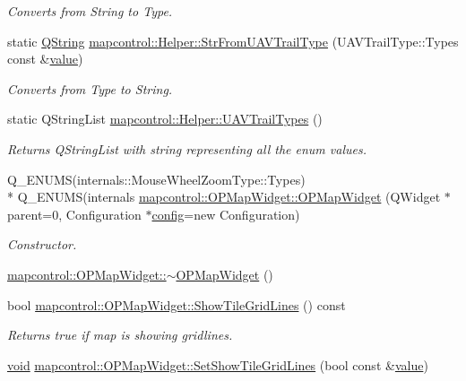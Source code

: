 \begin{DoxyCompactItemize}
\begin{DoxyCompactList}\small\item\em Converts from String to Type. \end{DoxyCompactList}\item 
static \hyperlink{group___u_a_v_objects_plugin_gab9d252f49c333c94a72f97ce3105a32d}{Q\-String} \hyperlink{group___o_p_map_widget_gab2895e09cf7115779c738cc43d815123}{mapcontrol\-::\-Helper\-::\-Str\-From\-U\-A\-V\-Trail\-Type} (U\-A\-V\-Trail\-Type\-::\-Types const \&\hyperlink{glext_8h_aa0e2e9cea7f208d28acda0480144beb0}{value})
\begin{DoxyCompactList}\small\item\em Converts from Type to String. \end{DoxyCompactList}\item 
static Q\-String\-List \hyperlink{group___o_p_map_widget_gad33e776681a2d3d4d44bef508d231336}{mapcontrol\-::\-Helper\-::\-U\-A\-V\-Trail\-Types} ()
\begin{DoxyCompactList}\small\item\em Returns Q\-String\-List with string representing all the enum values. \end{DoxyCompactList}\item 
Q\-\_\-\-E\-N\-U\-M\-S(internals\-::\-Mouse\-Wheel\-Zoom\-Type\-::\-Types) \\*
Q\-\_\-\-E\-N\-U\-M\-S(internals \hyperlink{group___o_p_map_widget_ga390f25c0a1e661e1496be4b21c4b4796}{mapcontrol\-::\-O\-P\-Map\-Widget\-::\-O\-P\-Map\-Widget} (Q\-Widget $\ast$parent=0, Configuration $\ast$\hyperlink{deflate_8c_a4473b5227787415097004fd39f55185e}{config}=new Configuration)
\begin{DoxyCompactList}\small\item\em Constructor. \end{DoxyCompactList}\item 
\hyperlink{group___o_p_map_widget_gabdcfea44244e345b2e4c966cc8d8c3c6}{mapcontrol\-::\-O\-P\-Map\-Widget\-::$\sim$\-O\-P\-Map\-Widget} ()
\item 
bool \hyperlink{group___o_p_map_widget_ga206c68521bc221bc6db0e63e187c4481}{mapcontrol\-::\-O\-P\-Map\-Widget\-::\-Show\-Tile\-Grid\-Lines} () const 
\begin{DoxyCompactList}\small\item\em Returns true if map is showing gridlines. \end{DoxyCompactList}\item 
\hyperlink{group___u_a_v_objects_plugin_ga444cf2ff3f0ecbe028adce838d373f5c}{void} \hyperlink{group___o_p_map_widget_gae09f73466c8f5ba738db48600eab7635}{mapcontrol\-::\-O\-P\-Map\-Widget\-::\-Set\-Show\-Tile\-Grid\-Lines} (bool const \&\hyperlink{glext_8h_aa0e2e9cea7f208d28acda0480144beb0}{value})

\end{DoxyCompactItemize}
